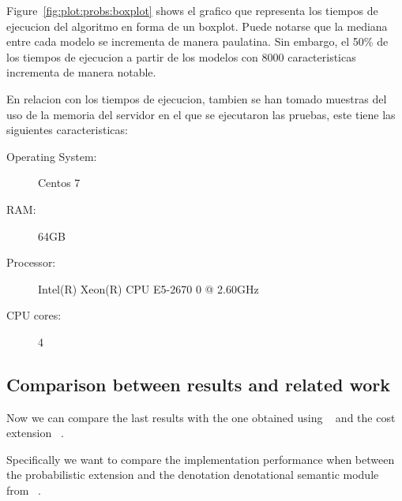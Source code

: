 Figure~\ref{fig:plot:probs:boxplot} shows el grafico
que representa los tiempos de ejecucion del algoritmo en forma de un
boxplot. Puede notarse que la mediana entre cada modelo se incrementa
de manera paulatina. Sin embargo, 
el 50\% de los tiempos de ejecucion a partir de los 
modelos con 8000 caracteristicas incrementa de manera notable.


En relacion con los tiempos de ejecucion, tambien se han
tomado muestras del uso de la memoria del servidor en el que se
ejecutaron las pruebas, este tiene las siguientes caracteristicas:

\begin{description}
	\item[Operating System:] Centos 7
	\item[RAM:] 64GB
	\item[Processor:] Intel(R) Xeon(R) CPU E5-2670 0 @ 2.60GHz
	\item[CPU cores:] 4
\end{description}



\subsection{Comparison between results and related work}
\label{sec:stat:impl:comp}


Now we can compare the last results with the one obtained using \fodaPA~\cite{acl13}
and the cost extension \fodaPAc~\cite{clc16}.


Specifically we want to compare the implementation performance when
between the probabilistic extension and the denotation denotational semantic module
from \fodaPA~\cite{acl13}.

